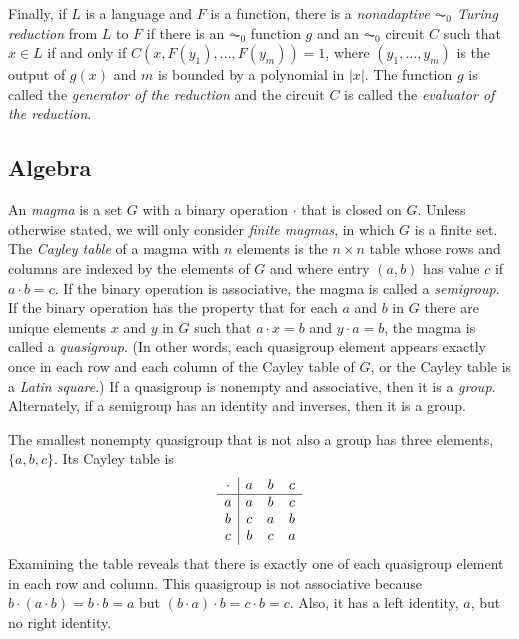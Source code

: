 \documentclass{article}
\begin{document}
Finally, if $L$ is a language and $F$ is a function, there is a \emph{nonadaptive $\AC_0$ Turing reduction} from $L$ to $F$ if there is an $\AC_0$ function $g$ and an $\AC_0$ circuit $C$ such that $x \in L$ if and only if $C(x, F(y_1), \dotsc, F(y_m)) = 1$, where $(y_1, \dotsc, y_m)$ is the output of $g(x)$ and $m$ is bounded by a polynomial in $|x|$.
The function $g$ is called the \emph{generator of the reduction} and the circuit $C$ is called the \emph{evaluator of the reduction}.

\subsection{Algebra}

An \emph{magma} is a set $G$ with a binary operation $\cdot$ that is closed on $G$.
Unless otherwise stated, we will only consider \emph{finite magmas}, in which $G$ is a finite set.
The \emph{Cayley table} of a magma with $n$ elements is the $n \times n$ table whose rows and columns are indexed by the elements of $G$ and where entry $(a, b)$ has value $c$ if $a \cdot b = c$.
If the binary operation is associative, the magma is called a \emph{semigroup}.
If the binary operation has the property that for each $a$ and $b$ in $G$ there are unique elements $x$ and $y$ in $G$ such that $a \cdot x = b$ and $y \cdot a = b$, the magma is called a \emph{quasigroup}.
(In other words, each quasigroup element appears exactly once in each row and each column of the Cayley table of $G$, or the Cayley table is a \emph{Latin square}.)
If a quasigroup is nonempty and associative, then it is a \emph{group}.
Alternately, if a semigroup has an identity and inverses, then it is a group.

\begin{example}\label{ex:quasigroup}
  The smallest nonempty quasigroup that is not also a group has three elements, $\{a, b, c\}$.
  Its Cayley table is
  \begin{equation*}
    \begin{array}{c | c c c}
      \cdot & a & b & c \\
      \hline
      a & a & b & c \\
      b & c & a & b \\
      c & b & c & a \\
    \end{array}
  \end{equation*}
  Examining the table reveals that there is exactly one of each quasigroup element in each row and column.
  This quasigroup is not associative because $b \cdot (a \cdot b) = b \cdot b = a$ but $(b \cdot a) \cdot b = c \cdot b = c$.
  Also, it has a left identity, $a$, but no right identity.
\end{example}
\end{document}
